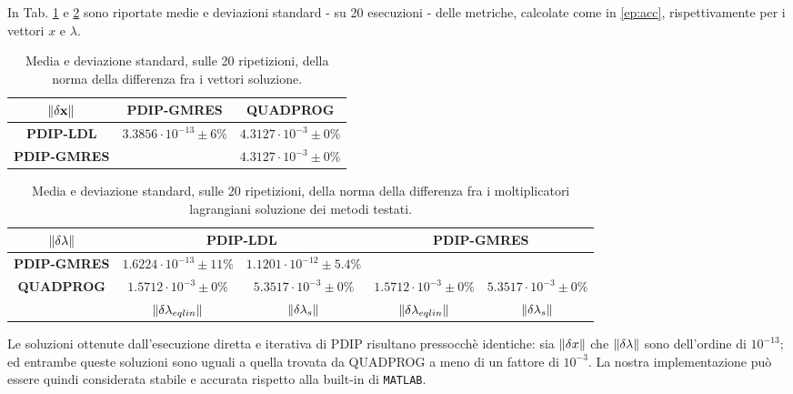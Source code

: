 In Tab. \ref{tab:normx} e \ref{tab:norml} sono riportate medie e deviazioni standard - su 20 esecuzioni - delle metriche, calcolate come in \ref{ep:acc}, rispettivamente per i vettori $x$ e $\lambda$.   

\begin{table}[!h]
\centering
\begin{tabular}{c|c|l|c}
$\mathbf{\left\lVert\delta x\right\rVert}$ & \multicolumn{2}{c|}{\textbf{PDIP-GMRES}}         & \textbf{QUADPROG}          \\ \hline
\textbf{PDIP-LDL}            & \multicolumn{2}{c|}{$3.3856\cdot10^{-13}\pm6\%$} & $4.3127\cdot10^{-3}\pm0\%$ \\ \hline
\textbf{PDIP-GMRES}          & \multicolumn{2}{c|}{}                            & $4.3127\cdot10^{-3}\pm0\%$
\end{tabular}
\caption{Media e deviazione standard, sulle 20 ripetizioni, della norma della differenza fra i vettori soluzione.\label{tab:normx}}
\end{table}

\begin{table}[!h]
\begin{tabular}{c|c|c|c|c|}
      $\mathbf{\left\lVert\delta\lambda\right\rVert}$             & \multicolumn{2}{c|}{\textbf{PDIP-LDL}}                                        & \multicolumn{2}{c|}{\textbf{PDIP-GMRES}}                                      \\ \hline
\textbf{PDIP-GMRES} & $1.6224\cdot10^{-13}\pm11\%$          & $1.1201\cdot10^{-12}\pm5.4\%$         & \multicolumn{2}{c|}{ }                                                        \\ 
\textbf{QUADPROG}   & $1.5712\cdot10^{-3}\pm0\%$            & $5.3517\cdot10^{-3}\pm0\%$            & $1.5712\cdot10^{-3}\pm0\%$            & $5.3517\cdot10^{{-3}}\pm0\%$          \\
                    & $\left\lVert \delta\lambda_{eqlin} \right\rVert$ & $\left\lVert \delta\lambda_{s} \right\rVert$ & $\left\lVert \delta\lambda_{eqlin} \right\rVert$ & $\left\lVert \delta\lambda_{s} \right\rVert$
\end{tabular}
\caption{Media e deviazione standard, sulle 20 ripetizioni, della norma della differenza fra i moltiplicatori lagrangiani soluzione dei metodi testati.\label{tab:norml}}
\end{table}

Le soluzioni ottenute dall'esecuzione diretta e iterativa di PDIP risultano pressocchè identiche: sia $\left\lVert\delta x\right\rVert$ che $\left\lVert\delta\lambda\right\rVert$ sono dell'ordine di $10^{-13}$; ed entrambe queste soluzioni sono uguali a quella trovata da QUADPROG a meno di un fattore di $10^{-3}$. La nostra implementazione può essere quindi considerata stabile e accurata rispetto alla built-in di \texttt{MATLAB}.